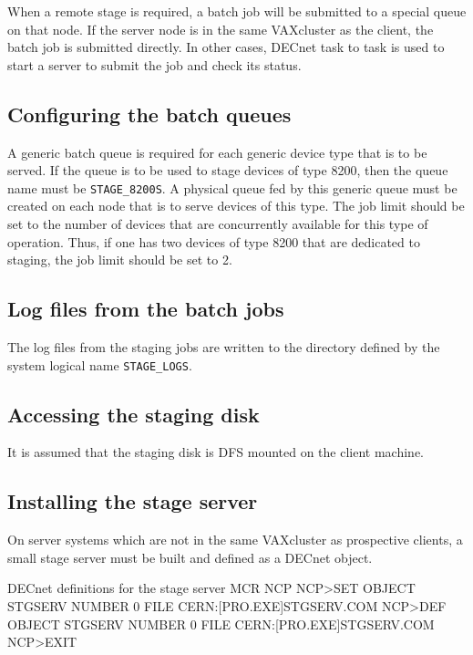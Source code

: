 When a remote stage is required, a batch job will be submitted
to a special queue on that node. If the server node is in the
same VAXcluster as the client, the batch job is submitted directly.
In other cases, DECnet task to task is used to start a server
to submit the job and check its status.

\subsection{Configuring the batch queues}

A generic batch queue is required for each generic device
type that is to be served. If the queue is to be used to
stage devices of type 8200, then the queue name must be
{\tt STAGE\_8200S}. A physical queue fed by this generic queue
must be created on each node that is to serve devices of this
type. The job limit should be set to the number of devices
that are concurrently available for this type of operation.
Thus, if one has two devices of type 8200 that are dedicated
to staging, the job limit should be set to 2.

\subsection{Log files from the batch jobs}

The log files from the staging jobs are written to the
directory defined by the system logical name {\tt STAGE\_LOGS}.

\subsection{Accessing the staging disk}

It is assumed that the staging disk is DFS mounted on the client
machine.

\subsection{Installing the stage server}

On server systems which are not in the same VAXcluster as prospective
clients, a small stage server must be built and defined as a DECnet
object.

\begin{XMPt}{DECnet definitions for the stage server}
MCR NCP
NCP>SET OBJECT STGSERV NUMBER 0 FILE CERN:[PRO.EXE]STGSERV.COM
NCP>DEF OBJECT STGSERV NUMBER 0 FILE CERN:[PRO.EXE]STGSERV.COM
NCP>EXIT
\end{XMPt}

